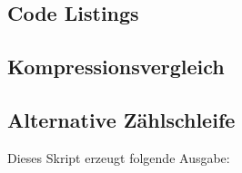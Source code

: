 \documentclass[10pt]{article}
\begin{document}
\begin{appendix}



\section{Code Listings}
\subsection{Kompressionsvergleich}
\label{listing:compression}
\lstset{language=bash}


\subsection{Alternative Zählschleife}
\label{listing:zahlen2}

\lstset{language=bash}


Dieses Skript erzeugt folgende Ausgabe:


\end{appendix}
\end{document}
